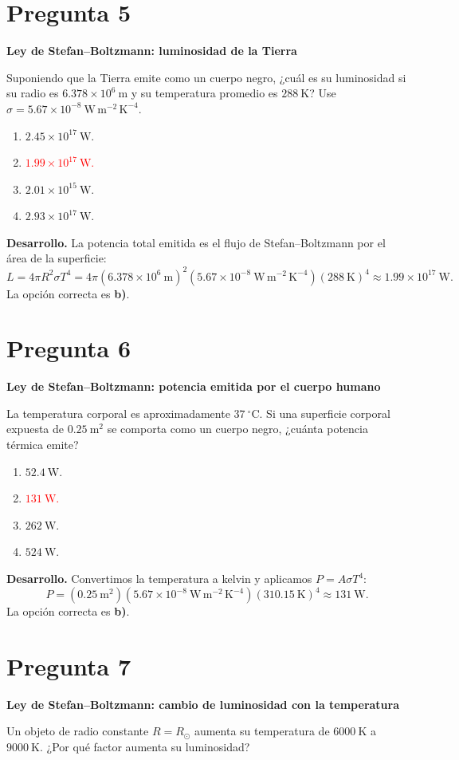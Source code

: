 \documentclass[a4paper,11pt]{article}
\newcommand{\pregunta}[2]{\section*{Pregunta #1}\textbf{#2}\par}
\begin{document}
\pregunta{5}{Ley de Stefan--Boltzmann: luminosidad de la Tierra}

Suponiendo que la Tierra emite como un cuerpo negro, ¿cuál es su luminosidad si su radio es $6.378\times10^6\ \mathrm{m}$ y su temperatura promedio es $288\ \mathrm{K}$? Use $\sigma=5.67\times10^{-8}\ \mathrm{W\,m^{-2}\,K^{-4}}$.

\begin{enumerate}
    \item $2.45\times10^{17}\ \mathrm{W}$.
    \item \textcolor{red}{$1.99\times10^{17}\ \mathrm{W}$.}
    \item $2.01\times10^{15}\ \mathrm{W}$.
    \item $2.93\times10^{17}\ \mathrm{W}$.
\end{enumerate}

\textbf{Desarrollo.} La potencia total emitida es el flujo de Stefan--Boltzmann por el área de la superficie:
\[
L=4\pi R^2\sigma T^4
=4\pi(6.378\times10^6\ \mathrm{m})^2(5.67\times10^{-8}\ \mathrm{W\,m^{-2}\,K^{-4}})(288\ \mathrm{K})^4
\approx1.99\times10^{17}\ \mathrm{W}.
\]
La opción correcta es \textbf{b)}. \parencite[Sec. 9.3, pp. 282--285]{chaparro2026}

\pregunta{6}{Ley de Stefan--Boltzmann: potencia emitida por el cuerpo humano}

La temperatura corporal es aproximadamente $37\ ^\circ\mathrm{C}$. Si una superficie corporal expuesta de $0.25\ \mathrm{m^2}$ se comporta como un cuerpo negro, ¿cuánta potencia térmica emite?

\begin{enumerate}
    \item $52.4\ \mathrm{W}$.
    \item \textcolor{red}{$131\ \mathrm{W}$.}
    \item $262\ \mathrm{W}$.
    \item $524\ \mathrm{W}$.
\end{enumerate}

\textbf{Desarrollo.} Convertimos la temperatura a kelvin y aplicamos $P=A\sigma T^4$:
\[
P=(0.25\ \mathrm{m^2})(5.67\times10^{-8}\ \mathrm{W\,m^{-2}\,K^{-4}})(310.15\ \mathrm{K})^4
\approx131\ \mathrm{W}.
\]
La opción correcta es \textbf{b)}. \parencite[Sec. 9.3, pp. 282--285]{chaparro2026}

\pregunta{7}{Ley de Stefan--Boltzmann: cambio de luminosidad con la temperatura}

Un objeto de radio constante $R=R_\odot$ aumenta su temperatura de $6000\ \mathrm{K}$ a $9000\ \mathrm{K}$. ¿Por qué factor aumenta su luminosidad?
\end{document}
